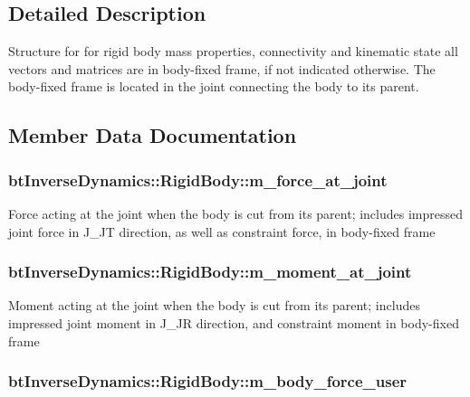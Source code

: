 \subsection{Detailed Description}
Structure for for rigid body mass properties, connectivity and kinematic state all vectors and matrices are in body-fixed frame, if not indicated otherwise. The body-fixed frame is located in the joint connecting the body to its parent. 

\subsection{Member Data Documentation}
\hypertarget{structbt_inverse_dynamics_1_1_rigid_body_00b16b69c8a91774162c934ca8ec1e2c}{
\subsubsection[m\_\-force\_\-at\_\-joint]{ {\bf btInverseDynamics::RigidBody::m\_\-force\_\-at\_\-joint}}}
\label{structbt_inverse_dynamics_1_1_rigid_body_00b16b69c8a91774162c934ca8ec1e2c}


Force acting at the joint when the body is cut from its parent; includes impressed joint force in J\_\-JT direction, as well as constraint force, in body-fixed frame \hypertarget{structbt_inverse_dynamics_1_1_rigid_body_e72019499bdedb8dc12131a48b3a243c}{
\subsubsection[m\_\-moment\_\-at\_\-joint]{ {\bf btInverseDynamics::RigidBody::m\_\-moment\_\-at\_\-joint}}}
\label{structbt_inverse_dynamics_1_1_rigid_body_e72019499bdedb8dc12131a48b3a243c}


Moment acting at the joint when the body is cut from its parent; includes impressed joint moment in J\_\-JR direction, and constraint moment in body-fixed frame \hypertarget{structbt_inverse_dynamics_1_1_rigid_body_c0d70c45cc5e1876fb7aba320293a7fb}{
\subsubsection[m\_\-body\_\-force\_\-user]{ {\bf btInverseDynamics::RigidBody::m\_\-body\_\-force\_\-user}}}
\label{structbt_inverse_dynamics_1_1_rigid_body_c0d70c45cc5e1876fb7aba320293a7fb}


